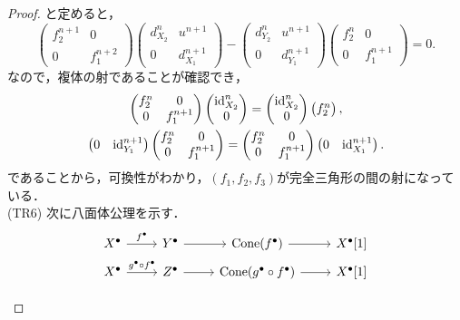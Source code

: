 \begin{proof}
	と定めると，
	\[\begin{pmatrix}f_2^{n+1}&0\\ 0& f_1^{n+2}\end{pmatrix}\begin{pmatrix}d_{X_2}^n & u^{n+1}\\ 0& d_{X_1}^{n+1}\end{pmatrix}- \begin{pmatrix}d_{Y_2}^n & u^{n+1}\\ 0& d_{Y_1}^{n+1}\end{pmatrix}\begin{pmatrix}f_2^{n}&0\\ 0& f_1^{n+1}\end{pmatrix}= 0.\]
	なので，複体の射であることが確認でき，
	\begin{gather*}
	\begin{pmatrix}f_2^{n}&0\\ 0& f_1^{n+1}\end{pmatrix}\begin{pmatrix}\mathrm{id}_{X_2}^n\\ 0\end{pmatrix}= \begin{pmatrix}\mathrm{id}_{X_2}^n\\ 0\end{pmatrix}\begin{pmatrix}f_2^n\end{pmatrix},\\
	\begin{pmatrix}0 & \mathrm{id}_{Y_1}^{n+1} \end{pmatrix}\begin{pmatrix}f_2^{n}&0\\ 0& f_1^{n+1}\end{pmatrix}= \begin{pmatrix}f_2^{n}&0\\ 0& f_1^{n+1}\end{pmatrix}\begin{pmatrix}0 & \mathrm{id}_{X_1}^{n+1} \end{pmatrix}.
\end{gather*}
であることから，可換性がわかり，$(f_1,f_2,f_3)$が完全三角形の間の射になっている．\\
(TR6) 次に八面体公理を示す．			\[
				\begin{tikzcd}[row sep=5pt]
			X^\bullet \ar[r,"f^\bullet"]& Y^\bullet\ar[r]& \Cone(f^\bullet) \ar[r]& X^\bullet[1]\\
			X^\bullet \ar[r,"g^\bullet\circ f^\bullet"]& Z^\bullet\ar[r]& \Cone( g^\bullet \circ f^\bullet) \ar[r]& X^\bullet[1]\\

\end{tikzcd}\]
\end{proof}
